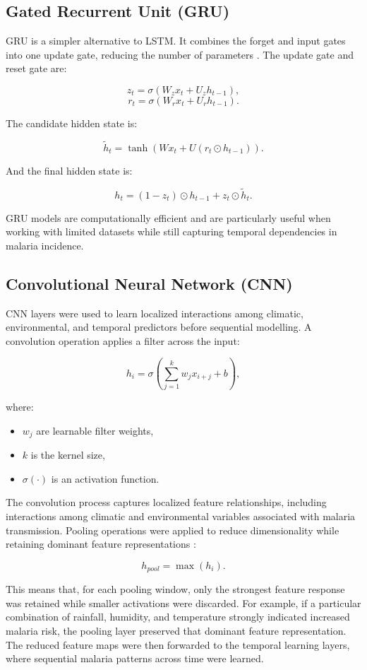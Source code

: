 	\subsection{Gated Recurrent Unit (GRU)}
	
	GRU is a simpler alternative to LSTM. It combines the forget and input gates into one update gate, reducing the number of parameters \cite{Goodfellow-et-al-2016} . The update gate and reset gate are:
	
	\[
	z_t = \sigma(W_z x_t + U_z h_{t-1}),
	\]
	\[
	r_t = \sigma(W_r x_t + U_r h_{t-1}).
	\]
	
	The candidate hidden state is:
	
	\[
	\tilde{h}_t = \tanh(W x_t + U(r_t \odot h_{t-1})).
	\]
	
	And the final hidden state is:
	
	\[
	h_t = (1 - z_t) \odot h_{t-1} + z_t \odot \tilde{h}_t.
	\]
	
	GRU models are computationally efficient and are particularly useful when working with limited datasets while still capturing temporal dependencies in malaria incidence.
	
	
\subsection{Convolutional Neural Network (CNN)}

CNN layers were used to learn localized interactions among climatic, environmental, and temporal predictors before sequential modelling. A convolution operation applies a filter across the input:

\[
h_i = \sigma \left( \sum_{j=1}^{k} w_j x_{i+j} + b \right),
\]

where:
\begin{itemize}
	\item $w_j$ are learnable filter weights,
	\item $k$ is the kernel size,
	\item $\sigma(\cdot)$ is an activation function.
\end{itemize}

The convolution process captures localized feature relationships, including interactions among climatic and environmental variables associated with malaria transmission. Pooling operations were applied to reduce dimensionality while retaining dominant feature representations \cite{Ooko2024}:

\[
h_{pool} = \max(h_i).
\]

This means that, for each pooling window, only the strongest feature response was retained while smaller activations were discarded. For example, if a particular combination of rainfall, humidity, and temperature strongly indicated increased malaria risk, the pooling layer preserved that dominant feature representation. The reduced feature maps were then forwarded to the temporal learning layers, where sequential malaria patterns across time were learned.
	
